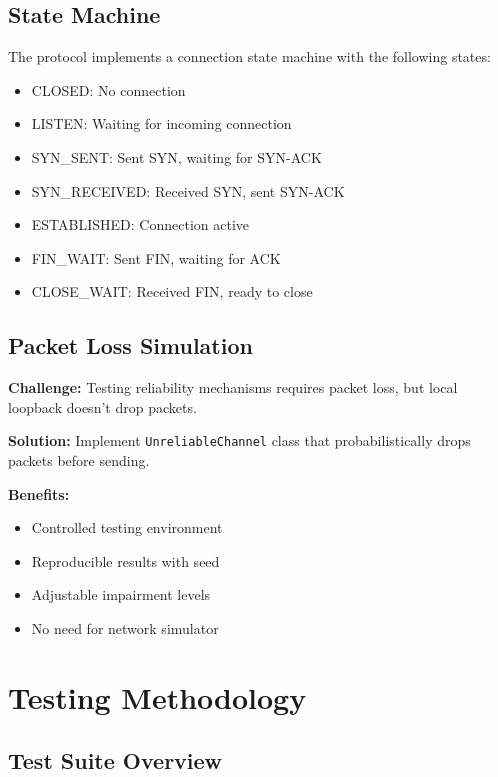 \documentclass[11pt,a4paper]{article}
\begin{document}
\subsection{State Machine}

The protocol implements a connection state machine with the following states:

\begin{itemize}
    \item CLOSED: No connection
    \item LISTEN: Waiting for incoming connection
    \item SYN\_SENT: Sent SYN, waiting for SYN-ACK
    \item SYN\_RECEIVED: Received SYN, sent SYN-ACK
    \item ESTABLISHED: Connection active
    \item FIN\_WAIT: Sent FIN, waiting for ACK
    \item CLOSE\_WAIT: Received FIN, ready to close
\end{itemize}

\subsection{Packet Loss Simulation}

\textbf{Challenge:} Testing reliability mechanisms requires packet loss, but local loopback doesn't drop packets.

\textbf{Solution:} Implement \texttt{UnreliableChannel} class that probabilistically drops packets before sending.

\textbf{Benefits:}
\begin{itemize}
    \item Controlled testing environment
    \item Reproducible results with seed
    \item Adjustable impairment levels
    \item No need for network simulator
\end{itemize}

\section{Testing Methodology}

\subsection{Test Suite Overview}
\end{document}
